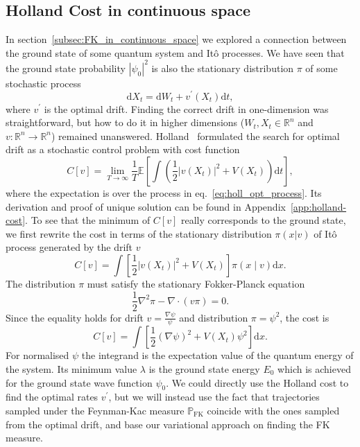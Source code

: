 \subsection{Holland Cost in continuous space}
In section~\ref{subsec:FK_in_continuous_space} we explored a connection between the ground state of some quantum system and It\^ o processes. We have seen that the ground state probability $|\psi_0|^2$ is also the stationary distribution $\pi$ of some stochastic process
\begin{equation}
	\label{eq:holl_opt_process}
	\mathrm{d} X_{t}=\mathrm{d} W_{t}+v^\prime\left(X_{t}\right) \mathrm{d} t,
\end{equation}
where $v^\prime$ is the optimal drift. Finding the correct drift in one-dimension was straightforward, but how to do it in higher dimensions ($W_{t}, X_{t} \in \mathbb{R}^n$ and $v: \mathbb{R}^n \rightarrow \mathbb{R}^n$) remained unanswered. Holland~\cite{holland1977cost} formulated the search for optimal drift as a stochastic control problem with cost function
\begin{equation}
	\label{eq:holland_cost}
	C[v]=\lim _{T \rightarrow \infty} \frac{1}{T} \mathbb{E}\left[\int \left(\frac{1}{2}\left|v\left(X_{t}\right)\right|^{2}+V\left(X_{t}\right)\right)\mathrm{d} t\right],
\end{equation}
where the expectation is over the process in eq.~\eqref{eq:holl_opt_process}. Its derivation and proof of unique solution can be found in Appendix~\ref{app:holland-cost}. To see that the minimum of $C[v]$ really corresponds to the ground state, we first rewrite the cost in terms of the stationary distribution $\pi(x | v)$ of It\^ o process generated by the drift $v$
\begin{equation}
C[v]=\int \left[\frac{1}{2}\left|v\left(X_{t}\right)\right|^{2}+V\left(X_{t}\right)\right] \pi(x \mid v)\mathrm{d}x.
\end{equation}
The distribution $\pi$ must satisfy the stationary Fokker-Planck equation
\begin{equation}
\frac{1}{2} \nabla^{2} \pi-\nabla \cdot(v \pi)=0.
\end{equation}
Since the equality holds for drift $v = \frac{\nabla \psi}{\psi}$ and distribution $\pi = \psi^2$, the cost is
\begin{equation}
C[v]=\int \left[\frac{1}{2}(\nabla \psi)^{2}+V\left(X_{t}\right) \psi^{2}\right]\mathrm{d}x.
\end{equation}
For normalised $\psi$ the integrand is the expectation value of the quantum energy of the system. Its minimum value $\lambda$ is the ground state energy $E_0$ which is achieved for the ground state wave function $\psi_{0}$. We could directly use the Holland cost to find the optimal rates $v^\prime$, but we will instead use the fact that trajectories sampled under the Feynman-Kac measure $\mathbb{P}_{\mathrm{FK}}$ coincide with the ones sampled from the optimal drift, and base our variational approach on finding the FK measure.

